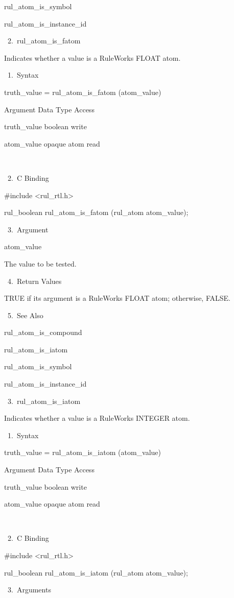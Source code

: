     rul_atom_is_symbol

    rul_atom_is_instance_id

 2. rul_atom_is_fatom

    Indicates whether a value is a RuleWorks
    FLOAT atom.

       1. Syntax

          truth_value = rul_atom_is_fatom
          (atom_value)

          Argument  Data Type    Access

          truth_value  boolean    write

          atom_value  opaque atom   read

           

       2. C Binding

          #include <rul_rtl.h>

          rul_boolean rul_atom_is_fatom
          (rul_atom atom_value);

       3. Argument

          atom_value

          The value to be tested.

       4. Return Values

          TRUE if its argument is a RuleWorks
          FLOAT atom; otherwise, FALSE.

       5. See Also

    rul_atom_is_compound

    rul_atom_is_iatom

    rul_atom_is_symbol

    rul_atom_is_instance_id

 3. rul_atom_is_iatom

    Indicates whether a value is a RuleWorks
    INTEGER atom.

       1. Syntax

          truth_value = rul_atom_is_iatom
          (atom_value)

          Argument  Data Type    Access

          truth_value  boolean    write

          atom_value  opaque atom   read

           

       2. C Binding

          #include <rul_rtl.h>

          rul_boolean rul_atom_is_iatom
          (rul_atom atom_value);

       3. Arguments

